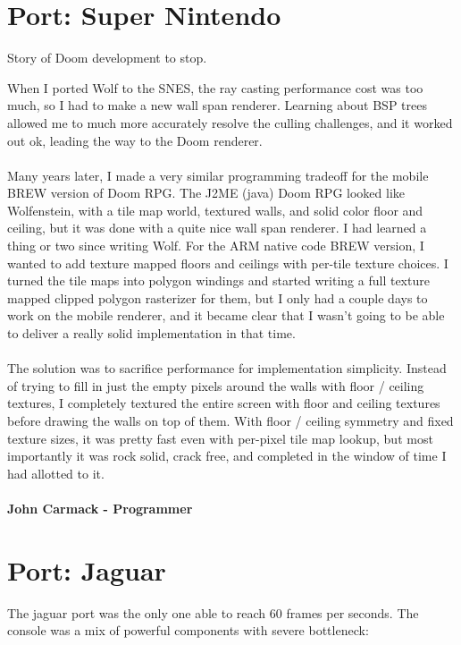 \documentclass[book.tex]{subfiles}
\begin{document}
\section{Port: Super Nintendo}
Story of Doom development to stop.\\
 \begin{fancyquotes}
    When I ported Wolf to the SNES, the ray casting performance cost was too much, so I had to make a new wall span renderer.  Learning about BSP trees allowed me  to much more accurately resolve the culling challenges, and it worked out ok, leading the way to the Doom renderer.\\
\\
Many years later, I made a very similar programming tradeoff for the mobile BREW version of Doom RPG.  The J2ME (java) Doom RPG looked like Wolfenstein, with a tile map world, textured walls, and solid color floor and ceiling, but it was done with a quite nice wall span renderer.  I had learned a thing or two since writing Wolf.  For the ARM native code BREW version, I wanted to add texture mapped floors and ceilings with per-tile texture choices.  I turned the tile maps into polygon windings and started writing a full texture mapped clipped polygon rasterizer for them, but I only had a couple days to work on the mobile renderer, and it became clear that I wasn’t going to be able to deliver a really solid implementation in that time.\\
 \\
The solution was to sacrifice performance for implementation simplicity.  Instead of trying to fill in just the empty pixels around the walls with floor / ceiling textures, I completely textured the entire screen with floor and ceiling textures before drawing the walls on top of them.  With floor / ceiling symmetry and fixed texture sizes, it was pretty fast even with per-pixel tile map lookup, but most importantly it was rock solid, crack free, and completed in the window of time I had allotted to it.\\
\\
\textbf{John Carmack - Programmer}
\end{fancyquotes}
\section{Port: Jaguar}
The jaguar port was the only one able to reach 60 frames per seconds. The console was a mix of powerful components with severe bottleneck: 
\end{document}
